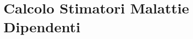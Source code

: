   \chapter{Calcolo Stimatori Malattie Dipendenti}
  \label{sec:stimatori_malattie_dipendenti}
\begin{comment}

\begin{savenotes}
\begin{table}[htb]
\centering
 \caption{Statistiche}
 \begin{tabular}{p{5cm}D{,}{,}{5.2}D{,}{,}{5.2}}
 \toprule
 	 & \multicolumn{1}{c}{\textbf{x_i}} & \multicolumn{1}{c}{\textbf{x_i}} \\
 \midrule 		
 	 & 10,7 & \\
 	 & 11,1 & \\
 	 & 11,1 & \\
 	 & 11,4 & \\
 	 & 11,4 & \\
 	 & 11,6 & \\
	 & 11,5 & \\ 
	 & 11,3 & \\
	 & 11,2 & \\
	 & 11,5 & \\
	 & 11,6 & \\
	 & 11,8 & \\
	 & 12,1 & \\
	 & 12,2 & \\
	 & 11,8 & \\
	 & 11,4 & \\
	 & 11,4 & \\
	 & 11,6 & \\
	 & 11,7 & \\
	 & 11,6 & \\
	 & 11,6 & \\
	 & 11,7 & \\							  
	 & 11,8 & \\
	 & 11,8 & \\
 \midrule
 	\makebox[5cm][r]{Totale} & 265,5  & 0,62068\\	
 \bottomrule
 \end{tabular} 
\end{table}
\end{savenotes}   
  
   \begin{tabular}{SS[table-format=2]}
 \toprule
 	{Anno} & {Giorni Malattia} \\
 \midrule


 \bottomrule
 \end{tabular} 
 
 \end{comment}